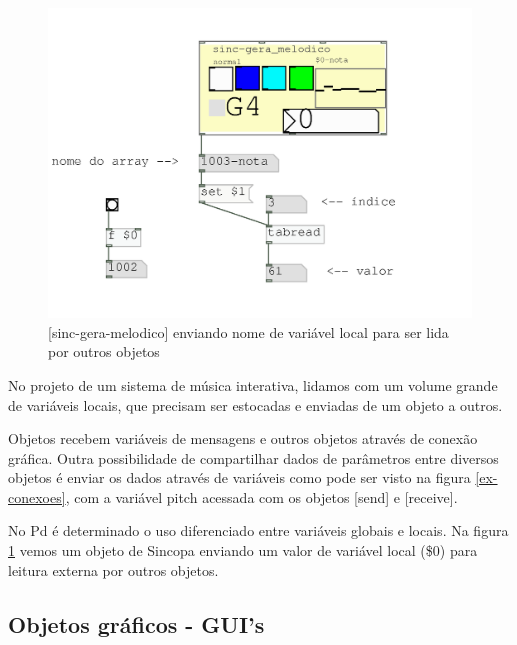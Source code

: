 \documentclass{ppgmus}
\begin{document}
\begin{figure}
\includegraphics[scale=.6]{ex-variaveis}
\caption{[sinc-gera-melodico] enviando nome de variável local para ser lida por outros objetos}
\label{ex-variaveis}
\end{figure}

No projeto de um sistema de música interativa, lidamos com um volume grande
de variáveis locais, que precisam ser estocadas e enviadas de um objeto a outros.

Objetos recebem variáveis de mensagens e outros objetos através de conexão
gráfica. Outra possibilidade de compartilhar dados de parâmetros entre diversos
objetos é enviar os dados através de variáveis como pode ser visto na figura \ref{ex-conexoes},
com a variável pitch acessada com os objetos [send] e [receive].

No Pd é determinado o uso diferenciado entre variáveis globais e locais.
Na figura \ref{ex-variaveis} vemos um objeto de Sincopa enviando um valor de 
variável local (\$0) para leitura externa por outros objetos.



\subsection{Objetos gráficos - GUI's}

\end{document}
